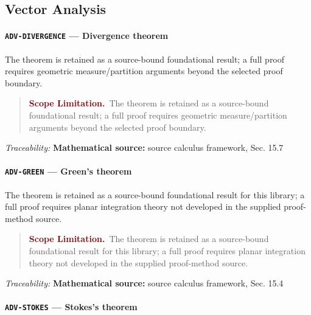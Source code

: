 \documentclass[10pt]{article}
\newcommand{\pidraw}[1]{\begingroup\urlstyle{tt}\nolinkurl{#1}\endgroup}
\theoremstyle{definition}
\theoremstyle{remark}
\newenvironment{scopelimitation}
{\begin{quote}\small\noindent\textbf{\textcolor{darkred}{Scope Limitation.}}\ }
{\end{quote}}
\begin{document}
\subsection{Vector Analysis}

\label{prf:ADV-DIVERGENCE}

\paragraph{\pidraw{ADV-DIVERGENCE} --- Divergence theorem}

The theorem is retained as a source-bound foundational result; a full proof requires geometric measure/partition arguments beyond the selected proof boundary.

\begin{scopelimitation}The theorem is retained as a source-bound foundational result; a full proof requires geometric measure/partition arguments beyond the selected proof boundary.\end{scopelimitation}

\smallskip\noindent\textit{Traceability:} \textbf{Mathematical source:} source calculus framework, Sec. 15.7\par

\label{prf:ADV-GREEN}

\paragraph{\pidraw{ADV-GREEN} --- Green's theorem}

The theorem is retained as a source-bound foundational result for this library; a full proof requires planar integration theory not developed in the supplied proof-method source.

\begin{scopelimitation}The theorem is retained as a source-bound foundational result for this library; a full proof requires planar integration theory not developed in the supplied proof-method source.\end{scopelimitation}

\smallskip\noindent\textit{Traceability:} \textbf{Mathematical source:} source calculus framework, Sec. 15.4\par

\label{prf:ADV-STOKES}

\paragraph{\pidraw{ADV-STOKES} --- Stokes's theorem}
\end{document}
